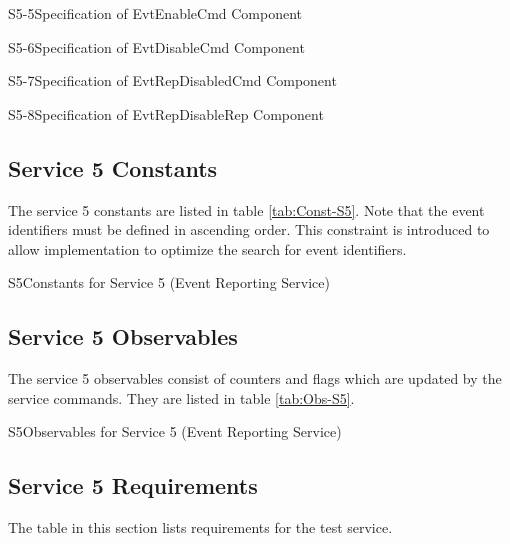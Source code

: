 \documentclass{pnp_article}
\begin{document}
\newpage
\begin{cr_cmd}{S5-5}{Specification of EvtEnableCmd Component}
\end{cr_cmd}

\begin{cr_cmd}{S5-6}{Specification of EvtDisableCmd Component}
\end{cr_cmd}

\newpage
\begin{cr_cmd}{S5-7}{Specification of EvtRepDisabledCmd Component}
\end{cr_cmd}

\begin{cr_rep}{S5-8}{Specification of EvtRepDisableRep Component}
\end{cr_rep}

\newpage
\subsection{Service 5 Constants}\label{sec:serv5Const}
The service 5 constants are listed in table \ref{tab:Const-S5}. Note that the event identifiers must be defined in ascending order. This constraint is introduced to allow implementation to optimize the search for event identifiers.

\begin{cr_const}{S5}{Constants for Service 5 (Event Reporting Service)}
\end{cr_const}


\subsection{Service 5 Observables}\label{sec:serv5Obs}
The service 5 observables consist of counters and flags which are updated by the service commands. They are listed in table \ref{tab:Obs-S5}.

\begin{cr_obs}{S5}{Observables for Service 5 (Event Reporting Service)}
\end{cr_obs}


\newpage
\subsection{Service 5 Requirements}
The table in this section lists requirements for the test service.
\end{document}
